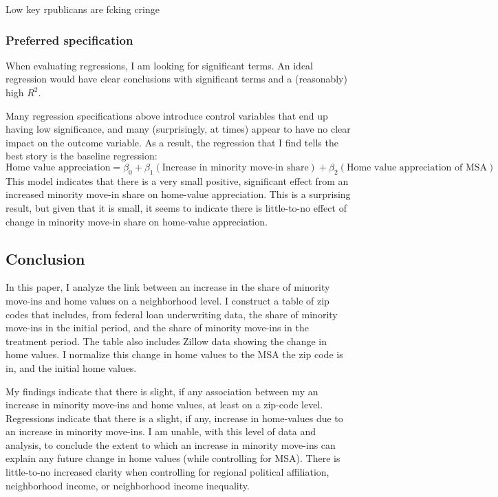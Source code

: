 \documentclass[11pt]{article}
\begin{document}
    Low key rpublicans are fcking cringe

    \subsubsection{Preferred specification}\label{preferred-specification}

    When evaluating regressions, I am looking for significant terms. An
ideal regression would have clear conclusions with significant terms and
a (reasonably) high \(R^2\).

Many regression specifications above introduce control variables that
end up having low significance, and many (surprisingly, at times) appear
to have no clear impact on the outcome variable. As a result, the
regression that I find tells the best story is the baseline regression:
\[\text{Home value appreciation}=\beta_0+\beta_1(\text{Increase in minority move-in share})+\beta_2(\text{Home value appreciation of MSA})\]
This model indicates that there is a very small positive, significant
effect from an increased minority move-in share on home-value
appreciation. This is a surprising result, but given that it is small,
it seems to indicate there is little-to-no effect of change in minority
move-in share on home-value appreciation.

    \subsection{Conclusion}\label{conclusion}

    In this paper, I analyze the link between an increase in the share of
minority move-ins and home values on a neighborhood level. I construct a
table of zip codes that includes, from federal loan underwriting data,
the share of minority move-ins in the initial period, and the share of
minority move-ins in the treatment period. The table also includes
Zillow data showing the change in home values. I normalize this change
in home values to the MSA the zip code is in, and the initial home
values.

My findings indicate that there is slight, if any association between my
an increase in minority move-ins and home values, at least on a zip-code
level. Regressions indicate that there is a slight, if any, increase in
home-values due to an increase in minority move-ins. I am unable, with
this level of data and analysis, to conclude the extent to which an
increase in minority move-ins can explain any future change in home
values (while controlling for MSA). There is little-to-no increased
clarity when controlling for regional political affiliation,
neighborhood income, or neighborhood income inequality.
\end{document}
